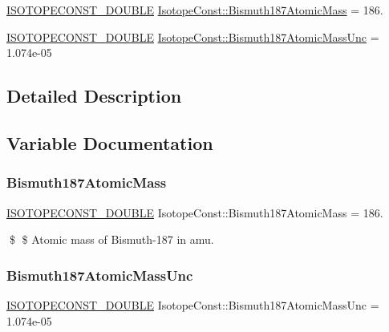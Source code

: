 \begin{DoxyCompactItemize}
\item 
\mbox{\hyperlink{group___isotope_const-_macros_ga8f45a7272ce02c0b4c65c44636ed719a}{I\+S\+O\+T\+O\+P\+E\+C\+O\+N\+S\+T\+\_\+\+D\+O\+U\+B\+LE}} \mbox{\hyperlink{group___isotope_const-_bismuth-_bi187_ga0cc95ccc0b162d370fa89dac7f1e3d58}{Isotope\+Const\+::\+Bismuth187\+Atomic\+Mass}} = 186.
\item 
\mbox{\hyperlink{group___isotope_const-_macros_ga8f45a7272ce02c0b4c65c44636ed719a}{I\+S\+O\+T\+O\+P\+E\+C\+O\+N\+S\+T\+\_\+\+D\+O\+U\+B\+LE}} \mbox{\hyperlink{group___isotope_const-_bismuth-_bi187_gad72cad4f95953b946d1b7a9c036481e6}{Isotope\+Const\+::\+Bismuth187\+Atomic\+Mass\+Unc}} = 1.\+074e-\/05
\end{DoxyCompactItemize}


\subsection{Detailed Description}


\subsection{Variable Documentation}
\mbox{\label{group___isotope_const-_bismuth-_bi187_ga0cc95ccc0b162d370fa89dac7f1e3d58}} 
\subsubsection{\texorpdfstring{Bismuth187\+Atomic\+Mass}{Bismuth187AtomicMass}}
{\footnotesize\ttfamily \mbox{\hyperlink{group___isotope_const-_macros_ga8f45a7272ce02c0b4c65c44636ed719a}{I\+S\+O\+T\+O\+P\+E\+C\+O\+N\+S\+T\+\_\+\+D\+O\+U\+B\+LE}} Isotope\+Const\+::\+Bismuth187\+Atomic\+Mass = 186.}

\$ \$ Atomic mass of Bismuth-\/187 in amu. \mbox{\label{group___isotope_const-_bismuth-_bi187_gad72cad4f95953b946d1b7a9c036481e6}} 
\subsubsection{\texorpdfstring{Bismuth187\+Atomic\+Mass\+Unc}{Bismuth187AtomicMassUnc}}
{\footnotesize\ttfamily \mbox{\hyperlink{group___isotope_const-_macros_ga8f45a7272ce02c0b4c65c44636ed719a}{I\+S\+O\+T\+O\+P\+E\+C\+O\+N\+S\+T\+\_\+\+D\+O\+U\+B\+LE}} Isotope\+Const\+::\+Bismuth187\+Atomic\+Mass\+Unc = 1.\+074e-\/05}

